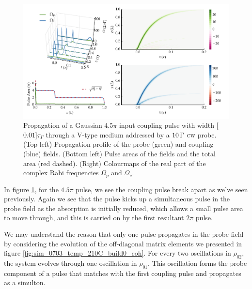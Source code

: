     \begin{figure}%
    \includegraphics[width=\linewidth]{figs/06_simultons/mb_vee_sit_plot_45pi_Ng1e4_fig1.pdf}
    \caption{
    Propagation of a Gaussian $4.5 \pi$ input coupling pulse with width
    \unit[$0.01$]{$\tau_\Gamma$} through a V-type medium addressed by a
    $\unit[10]{\Gamma}$ \textsc{cw} probe. (Top left) Propagation profile of the
    probe (green) and coupling (blue) fields. (Bottom left) Pulse areas of the
    fields and the total area (red dashed). (Right) Colourmaps of the real part
    of the complex Rabi frequencies $\Omega_{p}$ and $\Omega_{c}$.
    }
    \label{fig:pulse_cw_4pi_cmap}
    \end{figure}

    In figure \ref{fig:pulse_cw_4pi_cmap}, for the $4.5 \pi$ pulse, we see the
    coupling pulse break apart as we've seen previously. Again we see that the
    pulse kicks up a simultaneous pulse in the probe field as the absorption is
    initially reduced, which allows a small pulse area to move through, and this
    is carried on by the first resultant $2 \pi$ pulse.

    We may understand the reason that only one pulse propagates in the probe
    field by considering the evolution of the off-diagonal matrix elements we
    presented in figure \ref{fig:sim_0703_temp_210C_build0_coh}. For every two
    oscillations in $\rho_{02}$, the system evolves through one oscillation in
    $\rho_{01}$. This oscillation forms the probe component of a pulse that
    matches with the first coupling pulse and propagates as a simulton.

